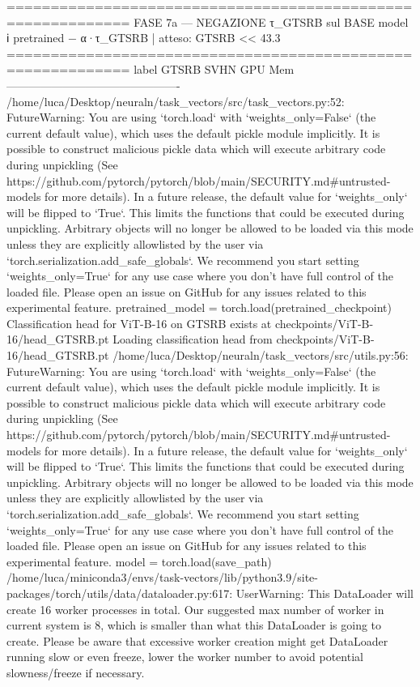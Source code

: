 ============================================================
  FASE 7a — NEGAZIONE τ_GTSRB sul BASE model
  ℹ pretrained − α·τ_GTSRB | atteso: GTSRB << 43.3%
============================================================
  label               GTSRB     SVHN    GPU Mem
  ----------------------------------------------
/home/luca/Desktop/neuraln/task_vectors/src/task_vectors.py:52: FutureWarning: You are using `torch.load` with `weights_only=False` (the current default value), which uses the default pickle module implicitly. It is possible to construct malicious pickle data which will execute arbitrary code during unpickling (See https://github.com/pytorch/pytorch/blob/main/SECURITY.md#untrusted-models for more details). In a future release, the default value for `weights_only` will be flipped to `True`. This limits the functions that could be executed during unpickling. Arbitrary objects will no longer be allowed to be loaded via this mode unless they are explicitly allowlisted by the user via `torch.serialization.add_safe_globals`. We recommend you start setting `weights_only=True` for any use case where you don't have full control of the loaded file. Please open an issue on GitHub for any issues related to this experimental feature.
  pretrained_model = torch.load(pretrained_checkpoint)
Classification head for ViT-B-16 on GTSRB exists at checkpoints/ViT-B-16/head_GTSRB.pt
Loading classification head from checkpoints/ViT-B-16/head_GTSRB.pt
/home/luca/Desktop/neuraln/task_vectors/src/utils.py:56: FutureWarning: You are using `torch.load` with `weights_only=False` (the current default value), which uses the default pickle module implicitly. It is possible to construct malicious pickle data which will execute arbitrary code during unpickling (See https://github.com/pytorch/pytorch/blob/main/SECURITY.md#untrusted-models for more details). In a future release, the default value for `weights_only` will be flipped to `True`. This limits the functions that could be executed during unpickling. Arbitrary objects will no longer be allowed to be loaded via this mode unless they are explicitly allowlisted by the user via `torch.serialization.add_safe_globals`. We recommend you start setting `weights_only=True` for any use case where you don't have full control of the loaded file. Please open an issue on GitHub for any issues related to this experimental feature.
  model = torch.load(save_path)
/home/luca/miniconda3/envs/task-vectors/lib/python3.9/site-packages/torch/utils/data/dataloader.py:617: UserWarning: This DataLoader will create 16 worker processes in total. Our suggested max number of worker in current system is 8, which is smaller than what this DataLoader is going to create. Please be aware that excessive worker creation might get DataLoader running slow or even freeze, lower the worker number to avoid potential slowness/freeze if necessary.
